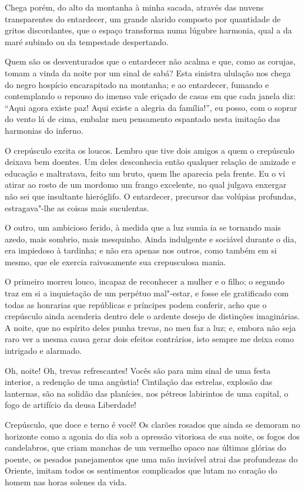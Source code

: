 Chega porém, do alto da montanha à minha sacada, através das nuvens
transparentes do entardecer, um grande alarido composto por 
quantidade de gritos discordantes, que o espaço transforma numa lúgubre harmonia, qual a da maré subindo ou da tempestade despertando.

Quem são os desventurados que o entardecer não acalma e que, como as
corujas, tomam a vinda da noite por um sinal de sabá? Esta sinistra
ululação nos chega do negro hospício encarapitado na montanha; e
ao entardecer, fumando e contemplando o repouso do imenso vale eriçado
de casas em que cada janela diz: ``Aqui agora existe paz!
Aqui existe a alegria da família!'', eu posso, com o
soprar do vento lá de cima, embalar meu pensamento espantado nesta imitação
das harmonias do inferno.

O crepúsculo excita os loucos. Lembro que tive dois amigos a quem o
crepúsculo deixava bem doentes. Um deles desconhecia então qualquer
relação de amizade e educação e maltratava, feito um bruto,
quem lhe aparecia pela frente. Eu o vi atirar ao rosto de um
mordomo um frango excelente, no qual julgava enxergar não sei que
insultante hieróglifo. O entardecer, precursor das volúpias profundas,
estragava"-lhe as coisas mais suculentas.



O outro, um ambicioso ferido, à medida que a luz sumia
ia se tornando mais azedo, mais sombrio, mais mesquinho. Ainda indulgente e sociável
durante o dia, era impiedoso à tardinha; e não era apenas nos outros,
como também em si mesmo, que ele exercia raivosamente sua 
crepusculosa mania.

O primeiro morreu louco, incapaz de reconhecer a mulher e o filho; o
segundo traz em si a inquietação de um perpétuo mal"-estar, e fosse
ele gratificado com todas as honrarias que repúblicas
e príncipes podem conferir, acho que o crepúsculo ainda acenderia dentro dele o ardente
desejo de distinções imaginárias. A noite, que no 
espírito deles punha trevas, no meu faz a luz; e, embora não seja raro ver a mesma
causa gerar dois efeitos contrários, isto sempre me deixa como 
intrigado e alarmado.

Oh, noite! Oh, trevas refrescantes! Vocês são para mim sinal de uma
festa interior, a redenção de uma angústia! Cintilação das
estrelas, explosão das lanternas, são na solidão das
planícies, nos pétreos labirintos de uma capital, o fogo de artifício da
deusa Liberdade!

Crepúsculo, que doce e terno é você! Os clarões rosados que ainda se
demoram no horizonte como a agonia do dia sob a opressão
vitoriosa de sua noite, os fogos dos candelabros, que criam manchas de
um vermelho opaco nas últimas glórias do poente, 
os pesados panejamentos que uma mão invisível atrai das profundezas do Oriente,
imitam todos os sentimentos complicados que lutam no coração do homem
nas horas solenes da vida.

